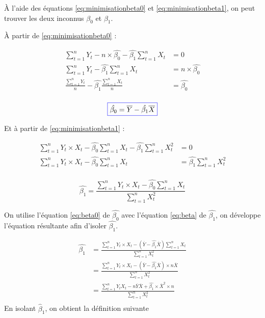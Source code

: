 \documentclass[11pt,french]{report}
\begin{document}
À l'aide des équations \ref{eq:minimisationbeta0} et \ref{eq:minimisationbeta1}, on peut trouver les deux inconnus $\beta_0$ et $\beta_1$.

À partir de \ref{eq:minimisationbeta0} :

\begin{align*}
\sum_{t=1}^n Y_t - n \times \hat{\beta_0} - \hat{\beta_1} \sum_{t=1}^n X_t &= 0 \\
\sum_{t=1}^n Y_t - \hat{\beta_1} \sum_{t=1}^n X_t &=  n \times \hat{\beta_0} \\
\frac{\sum_{t=1}^n Y_t}{n} - \hat{\beta_1} \frac{\sum_{t=1}^n X_t}{n} &=  \hat{\beta_0} \\
\end{align*}

\begin{equation}
\label{eq:beta0}
\color{blue}
\boxed{\color{black}
\hat{\beta_0} = \overline{Y} - \hat{\beta_1} \overline{X}}
\end{equation}

Et à partir de \ref{eq:minimisationbeta1} :

\begin{align*}
\sum_{t=1}^n Y_t \times X_t - \hat{\beta_0} \sum_{t=1}^n X_t - \hat{\beta_1} \sum_{t=1}^n X_t^2 &= 0 \\
\sum_{t=1}^n Y_t \times X_t - \hat{\beta_0} \sum_{t=1}^n X_t &=  \hat{\beta_1} \sum_{t=1}^n X_t^2 \\
\end{align*}

\begin{equation}
\label{eq:beta}
\hat{\beta_1} =  \frac{\sum_{t=1}^n Y_t \times X_t - \hat{\beta_0} \sum_{t=1}^n X_t}{\sum_{t=1}^n X_t^2}
\end{equation}

On utilise l'équation \ref{eq:beta0} de $\hat{\beta_0}$ avec l'équation \ref{eq:beta} de $\hat{\beta_1}$, on développe l'équation résultante afin d'isoler $\hat{\beta_1}$.

\begin{align*}
\hat{\beta_1} &= \frac{\sum_{t=1}^n Y_t \times X_t - (\overline{Y} - \hat{\beta_1}\overline{X})\sum_{t=1}^n X_t}{\sum_{t=1}^n X_t^2} \\
&= \frac{\sum_{t=1}^n Y_t \times X_t - (\overline{Y} - \hat{\beta_1}\overline{X})\times n \overline{X}}{\sum_{t=1}^n X_t^2} \\
&= \frac{\sum_{t=1}^n Y_t X_t - n\overline{Y}\overline{X} + \hat{\beta_1}\times \overline{X}^2 \times n}{\sum_{t=1}^n X_t^2} \\
\end{align*}
En isolant $\hat{\beta}_1$, on obtient la définition suivante
\end{document}
